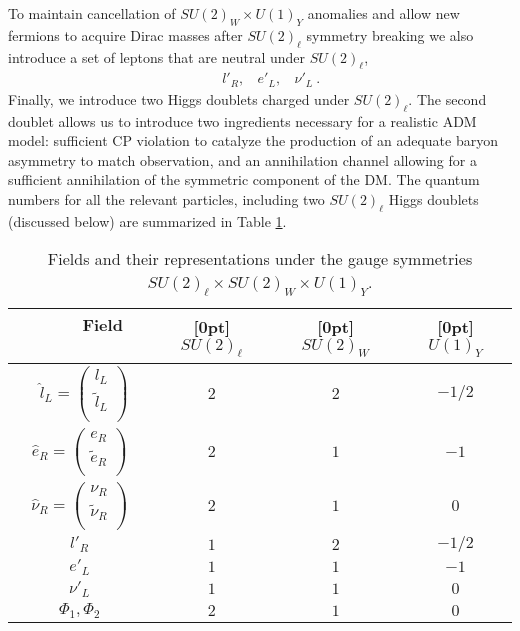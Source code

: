 \documentclass[prd,showpcs,amsmath,amssymb,nofootinbib,preprintnumbers,balancelastpage,longbibliography,superscriptaddress,notitlepage]{revtex4}
\def\bea{\begin{eqnarray}}
\def\eea{\end{eqnarray}}
\def\bea{\begin{eqnarray}}
\def\eea{\end{eqnarray}}
\begin{document}
To maintain cancellation of  $SU(2)_W\times U(1)_Y$ anomalies and allow new fermions to acquire Dirac masses after $SU(2)_\ell$ symmetry breaking we also introduce a set of leptons that are neutral under $SU(2)_\ell$,
\bea
&& {l}'_{R}  , \ \ \ \ {e}'_{L}  , \ \ \ \ {\nu}'_{L} \ .
\eea
Finally, we introduce two Higgs doublets charged under $SU(2)_\ell$. The second doublet allows us to introduce two ingredients necessary for a realistic ADM model: sufficient CP violation to catalyze the production of an adequate baryon asymmetry to match observation, and an annihilation channel allowing for a sufficient annihilation of the symmetric component of the DM.
The quantum numbers for all the relevant particles, including two $SU(2)_\ell$ Higgs doublets (discussed below) are summarized in
Table \ref{table2}. \\

{\renewcommand{\arraystretch}{1.4}\begin{table}[t!]
\begin{center}
    \begin{tabular}{| c || c | c | c |}
    \hline
       \ \ \ \ \ Field \ \ \ \ \  & \raisebox{0ex}[0pt]{$ \ \ \ SU(2)_\ell \ \ \ $} & \raisebox{0ex}[0pt]{$ \ \ \ SU(2)_W \ \ \ $} & \raisebox{0ex}[0pt]{$ \ \ \ U(1)_Y \ \ \  $}  
       \\ \hline\hline
         \ \ $\hat{l}_{L} =  \left(\!\begin{array}{c}
    l_L\\
    \tilde{l}_L \\
  \end{array} \!\right) \ \ $ & $2$ & $2$ & $-1/2$  \\ \hline
         $\hat{e}_R =  \left(\!\!\begin{array}{c}
    e_R\\
    \tilde{e}_R \\
  \end{array} \!\!\right)$ & $2$ & $1$ &  $-1$  \\ \hline
          $\hat{\nu}_R = \left(\!\!\begin{array}{c}
    \nu_R\\
    \tilde{\nu}_R \\
  \end{array} \!\!\right)$ & $2$ & $1$ &  $0$  \\ \hline
               $l'_{R}$ & $1$ & $2$ & $-1/2$  \\ \hline
         $e'_L$ & $1$ & $1$ &  $-1$  \\ \hline
          $\nu'_L$ & $1$ & $1$ &  $0$  \\ \hline
         ${\Phi}_1, \Phi_2$ & $2$ & $1$ &  $0$  \\ \hline
    \end{tabular}
\end{center}
\caption{\small{Fields and their representations under the gauge symmetries
$SU(2)_{\ell} \times SU(2)_{W} \times U(1)_Y$.}}
\label{table2}
\end{table}}
\end{document}
